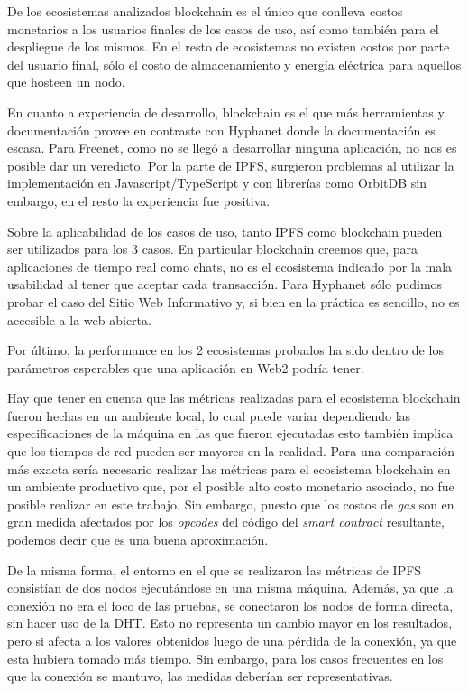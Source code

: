 De los ecosistemas analizados blockchain es el único que conlleva costos monetarios a los usuarios finales de los casos de uso, así como también para el despliegue de los mismos. En el resto de ecosistemas no existen costos por parte del usuario final, sólo el costo de almacenamiento y energía eléctrica para aquellos que hosteen un nodo.

En cuanto a experiencia de desarrollo, blockchain es el que más herramientas y documentación provee en contraste con Hyphanet donde la documentación es escasa. Para Freenet, como no se llegó a desarrollar ninguna aplicación, no nos es posible dar un veredicto. Por la parte de IPFS, surgieron problemas al utilizar la implementación en Javascript/TypeScript y con librerías como OrbitDB sin embargo, en el resto la experiencia fue positiva.

Sobre la aplicabilidad de los casos de uso, tanto IPFS como blockchain pueden ser utilizados para los 3 casos. En particular blockchain creemos que, para aplicaciones de tiempo real como chats, no es el ecosistema indicado por la mala usabilidad al tener que aceptar cada transacción. Para Hyphanet sólo pudimos probar el caso del Sitio Web Informativo y, si bien en la práctica es sencillo, no es accesible a la web abierta.

Por último, la performance en los 2 ecosistemas probados ha sido dentro de los parámetros esperables que una aplicación en Web2 podría tener.

Hay que tener en cuenta que las métricas realizadas para el ecosistema blockchain fueron hechas en un ambiente local, lo cual puede variar dependiendo las especificaciones de la máquina en las que fueron ejecutadas esto también implica que los tiempos de red pueden ser mayores en la realidad. Para una comparación más exacta sería necesario realizar las métricas para el ecosistema blockchain en un ambiente productivo que, por el posible alto costo monetario asociado, no fue posible realizar en este trabajo. Sin embargo, puesto que los costos de \textit{gas} son en gran medida afectados por los \textit{opcodes} del código del \textit{smart contract} resultante, podemos decir que es una buena aproximación.

De la misma forma, el entorno en el que se realizaron las métricas de IPFS consistían de dos nodos ejecutándose en una misma máquina. Además, ya que la conexión no era el foco de las pruebas, se conectaron los nodos de forma directa, sin hacer uso de la DHT. Esto no representa un cambio mayor en los resultados, pero si afecta a los valores obtenidos luego de una pérdida de la conexión, ya que esta hubiera tomado más tiempo. Sin embargo, para los casos frecuentes en los que la conexión se mantuvo, las medidas deberían ser representativas.